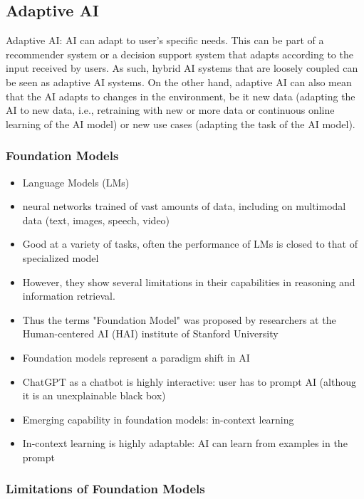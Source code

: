 \subsection{Adaptive AI}

Adaptive AI: AI can adapt to user's specific needs. This can be part of a recommender system or a decision support
system that adapts according to the input received by users. As such, hybrid AI systems that are loosely coupled can 
be seen as adaptive AI systems. On the other hand, adaptive AI can also mean that the AI adapts to changes in the
environment, be it new data (adapting the AI to new data, i.e., retraining with new or more data or continuous online
learning of the AI model) or new use cases (adapting the task of the AI model).

\subsubsection{Foundation Models}

\begin{itemize}
    \item Language Models (LMs)
    \item neural networks trained of vast amounts of data, including on multimodal data (text, images, speech, video)
    \item Good at a variety of tasks, often the performance of LMs is closed to that of specialized model
    \item However, they show several limitations in their capabilities in reasoning and information retrieval. 
    \item Thus the terms "Foundation Model" was proposed by researchers at the Human-centered AI (HAI) institute of Stanford University
\end{itemize}

\begin{itemize}
    \item Foundation models represent a paradigm shift in AI
    \item ChatGPT as a chatbot is highly interactive: user has to prompt AI (althoug it is an unexplainable black box)
    \item Emerging capability in foundation models: in-context learning 
    \item In-context learning is highly adaptable: AI can learn from examples in the prompt 
\end{itemize}

\subsubsection{Limitations of Foundation Models}

